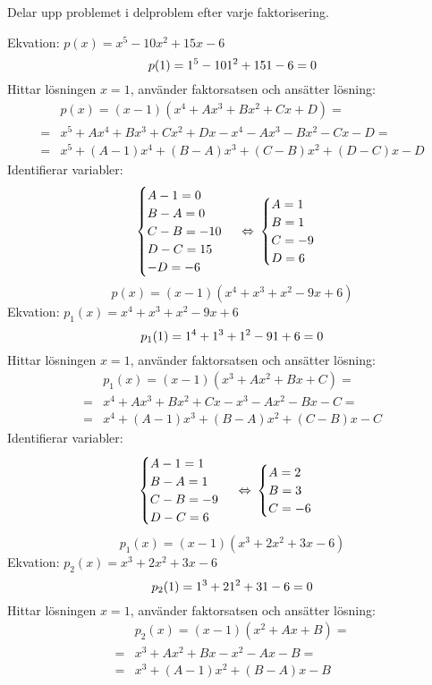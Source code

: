 \pagebreak
\begin{task}{2.37}
	Delar upp problemet i delproblem efter varje faktorisering.
	
	Ekvation: $p(x)=x^5-10x^2+15x-6$
	\[p(1)=1^5-10\*1^2+15\*1-6=0\]
	Hittar lösningen $x=1$, använder faktorsatsen och ansätter lösning:
	\begin{align*}
	&p(x)=(x-1)(x^4+Ax^3+Bx^2+Cx+D)= \\ =
	&x^5+Ax^4+Bx^3+Cx^2+Dx-x^4-Ax^3-Bx^2-Cx-D= \\ =
	&x^5+(A-1)x^4+(B-A)x^3+(C-B)x^2+(D-C)x-D
	\end{align*}
	Identifierar variabler:
	\[\begin{cases}
	A-1=0 \\
	B-A=0 \\
	C-B=-10 \\
	D-C=15 \\
	-D=-6
	\end{cases}
	\lra
	\begin{cases}
	A=1 \\
	B=1 \\
	C=-9 \\
	D=6
	\end{cases}\]
	\[p(x)=(x-1)(x^4+x^3+x^2-9x+6)\]
	Ekvation: $p_1(x)=x^4+x^3+x^2-9x+6$
	\[p_1(1)=1^4+1^3+1^2-9\*1+6=0\]
	Hittar lösningen $x=1$, använder faktorsatsen och ansätter lösning:
	\begin{align*}
	&p_1(x)=(x-1)(x^3+Ax^2+Bx+C)= \\ =
	&x^4+Ax^3+Bx^2+Cx-x^3-Ax^2-Bx-C= \\ =
	&x^4+(A-1)x^3+(B-A)x^2+(C-B)x-C
	\end{align*}
	Identifierar variabler:
	\[\begin{cases}
	A-1=1 \\
	B-A=1 \\
	C-B=-9 \\
	D-C=6
	\end{cases}
	\lra
	\begin{cases}
	A=2 \\
	B=3 \\
	C=-6
	\end{cases}\]
	\[p_1(x)=(x-1)(x^3+2x^2+3x-6)\]
	Ekvation: $p_2(x)=x^3+2x^2+3x-6$
	\[p_2(1)=1^3+2\*1^2+3\*1-6=0\]
	Hittar lösningen $x=1$, använder faktorsatsen och ansätter lösning:
	\begin{align*}
	&p_2(x)=(x-1)(x^2+Ax+B)= \\ =
	&x^3+Ax^2+Bx-x^2-Ax-B= \\ =
	&x^3+(A-1)x^2+(B-A)x-B

\end{align*}
\end{task}
